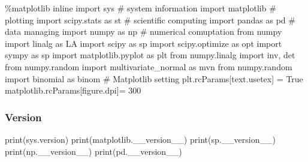 \documentclass[
  letterpaper,
  DIV=11,
  numbers=noendperiod]{scrartcl}
\newenvironment{Shaded}{\begin{snugshade}}{\end{snugshade}}
\newcommand{\BuiltInTok}[1]{\textcolor[rgb]{0.00,0.23,0.31}{#1}}
\newcommand{\CommentTok}[1]{\textcolor[rgb]{0.37,0.37,0.37}{#1}}
\newcommand{\DecValTok}[1]{\textcolor[rgb]{0.68,0.00,0.00}{#1}}
\newcommand{\ImportTok}[1]{\textcolor[rgb]{0.00,0.46,0.62}{#1}}
\newcommand{\NormalTok}[1]{\textcolor[rgb]{0.00,0.23,0.31}{#1}}
\newcommand{\OperatorTok}[1]{\textcolor[rgb]{0.37,0.37,0.37}{#1}}
\newcommand{\StringTok}[1]{\textcolor[rgb]{0.13,0.47,0.30}{#1}}
\newcommand{\VariableTok}[1]{\textcolor[rgb]{0.07,0.07,0.07}{#1}}
\begin{document}
\begin{Shaded}
\begin{Highlighting}[numbers=left,,]
\OperatorTok{\%}\NormalTok{matplotlib inline}
\ImportTok{import}\NormalTok{ sys }\CommentTok{\# system information}
\ImportTok{import}\NormalTok{ matplotlib }\CommentTok{\# plotting}
\ImportTok{import}\NormalTok{ scipy.stats }\ImportTok{as}\NormalTok{ st }\CommentTok{\# scientific computing}
\ImportTok{import}\NormalTok{ pandas }\ImportTok{as}\NormalTok{ pd }\CommentTok{\# data managing}
\ImportTok{import}\NormalTok{ numpy }\ImportTok{as}\NormalTok{ np }\CommentTok{\# numerical comuptation}
\ImportTok{from}\NormalTok{ numpy }\ImportTok{import}\NormalTok{ linalg }\ImportTok{as}\NormalTok{ LA}
\ImportTok{import}\NormalTok{ scipy }\ImportTok{as}\NormalTok{ sp}
\ImportTok{import}\NormalTok{ scipy.optimize }\ImportTok{as}\NormalTok{ opt}
\ImportTok{import}\NormalTok{ sympy }\ImportTok{as}\NormalTok{ sp}
\ImportTok{import}\NormalTok{ matplotlib.pyplot }\ImportTok{as}\NormalTok{ plt}
\ImportTok{from}\NormalTok{ numpy.linalg }\ImportTok{import}\NormalTok{ inv, det}
\ImportTok{from}\NormalTok{ numpy.random }\ImportTok{import}\NormalTok{ multivariate\_normal }\ImportTok{as}\NormalTok{ mvn}
\ImportTok{from}\NormalTok{ numpy.random }\ImportTok{import}\NormalTok{ binomial }\ImportTok{as}\NormalTok{ binom}
\CommentTok{\# Matplotlib setting}
\NormalTok{plt.rcParams[}\StringTok{\textquotesingle{}text.usetex\textquotesingle{}}\NormalTok{] }\OperatorTok{=} \VariableTok{True}
\NormalTok{matplotlib.rcParams[}\StringTok{\textquotesingle{}figure.dpi\textquotesingle{}}\NormalTok{]}\OperatorTok{=} \DecValTok{300}
\end{Highlighting}
\end{Shaded}

\hypertarget{version}{%
\subsubsection{Version}\label{version}}

\begin{Shaded}
\begin{Highlighting}[numbers=left,,]
\BuiltInTok{print}\NormalTok{(sys.version)}
\BuiltInTok{print}\NormalTok{(matplotlib.\_\_version\_\_)}
\BuiltInTok{print}\NormalTok{(sp.\_\_version\_\_)}
\BuiltInTok{print}\NormalTok{(np.\_\_version\_\_)}
\BuiltInTok{print}\NormalTok{(pd.\_\_version\_\_)}
\end{Highlighting}
\end{Shaded}
\end{document}

